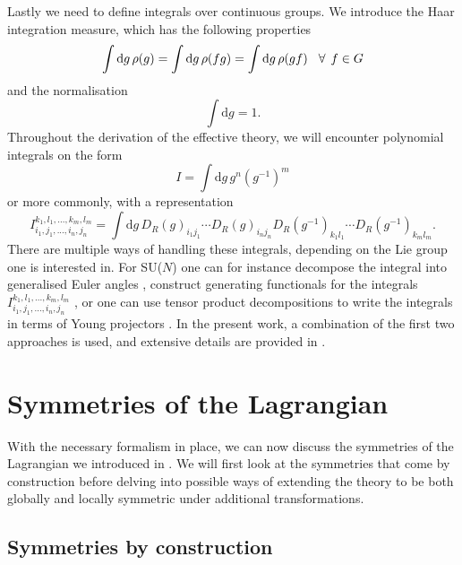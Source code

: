 Lastly we need to define integrals over continuous groups. We introduce
the Haar integration measure, which has the following properties
%
\begin{equation}
  \int \mathrm{d}g \, \rho(g) = \int \mathrm{d}g \, \rho(fg) 
    = \int \mathrm{d}g \, \rho(gf) \hskip2ex \forall \hskip1ex f \in G
\end{equation}
%
and the normalisation
%
\begin{equation}
  \int \mathrm{d}g = 1.
\end{equation}
%
Throughout the derivation of the effective theory, we will encounter polynomial
integrals on the form
%
\begin{equation}
  I = \int \mathrm{d} g \, g^n (g^{-1})^m
\end{equation}
%
or more commonly, with a representation
%
\begin{equation} \label{eq:group-integrals-representation}
  I_{i_1,j_1,...,i_n,j_n}^{k_1,l_1,...,k_m,l_m} = \int \mathrm{d} g \,
    D_R(g)_{i_1j_1} \cdots D_R(g)_{i_nj_n} D_R(g^{-1})_{k_1l_1} \cdots D_R(g^{-1})_{k_ml_m}.
\end{equation}
%
There are multiple ways of handling these integrals, depending on the Lie group
one is interested in. For SU($N$) one can for instance decompose the integral
into generalised Euler angles \citep[as described in][]{Tilma:2004kp}, construct
generating functionals for the integrals
$I_{i_1,j_1,...,i_n,j_n}^{k_1,l_1,...,k_m,l_m}$ \citep[details
in][]{Creutz:1978ub}, or one can use tensor product decompositions to write the
integrals in terms of Young projectors \citep{Myers:2014dia}. In the present
work, a combination of the first two approaches is used, and extensive details
are provided in
.

\section{Symmetries of the Lagrangian} \label{sec:symmetries}

With the necessary formalism in place, we can now discuss the symmetries of the
Lagrangian we introduced in . We will first look at the
symmetries that come by construction before delving into possible ways of
extending the theory to be both globally and locally symmetric under additional
transformations.

\subsection{Symmetries by construction}

